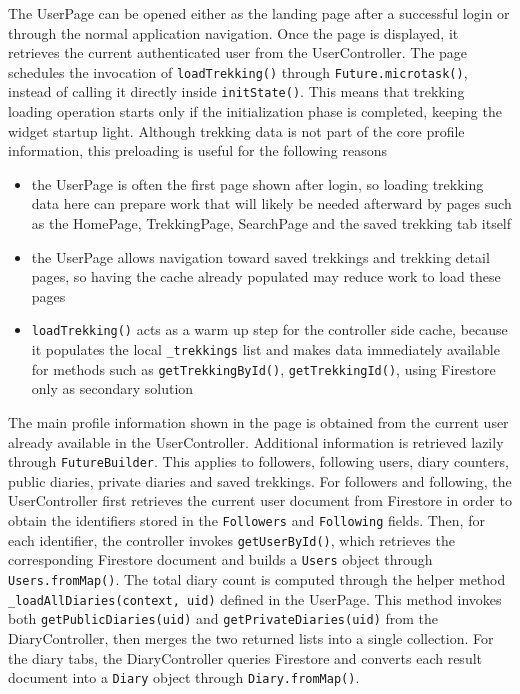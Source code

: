 The UserPage can be opened either as the landing page after a successful login or through the normal application navigation. Once the page is displayed, it retrieves the current authenticated user from the UserController.
The page schedules the invocation of \texttt{loadTrekking()} through \texttt{Future.microtask()}, instead of calling it directly inside \texttt{initState()}. This means that trekking loading operation starts only if the initialization phase is completed, keeping the widget startup light.
Although trekking data is not part of the core profile information, this preloading is useful for the following reasons
\begin{itemize}
    \item the UserPage is often the first page shown after login, so loading trekking data here can prepare work that will likely be needed  afterward by pages such as the HomePage, TrekkingPage, SearchPage and the saved trekking tab itself
    \item the UserPage allows navigation toward saved trekkings and trekking detail pages, so having the cache already populated may reduce work to load these pages
    \item \texttt{loadTrekking()} acts as a warm up step for the controller side cache, because it populates the local \texttt{\_trekkings} list and makes data immediately available for methods such as \texttt{getTrekkingById()}, \texttt{getTrekkingId()}, using Firestore only as secondary solution
\end{itemize}
The main profile information shown in the page is obtained from the current user already available in the UserController. Additional information is retrieved lazily through \texttt{FutureBuilder}. This applies to followers, following users, diary counters, public diaries, private diaries and saved trekkings.
For followers and following, the UserController first retrieves the current user document from Firestore in order to obtain the identifiers stored in the \texttt{Followers} and \texttt{Following} fields. Then, for each identifier, the controller invokes \texttt{getUserById()}, which retrieves the corresponding Firestore document and builds a \texttt{Users} object through \texttt{Users.fromMap()}.
The total diary count is computed through the helper method \texttt{\_loadAllDiaries(context, uid)} defined in the UserPage. This method invokes both \texttt{getPublicDiaries(uid)} and \texttt{getPrivateDiaries(uid)} from the DiaryController, then merges the two returned lists into a single collection. 
For the diary tabs, the DiaryController queries Firestore and converts each result document into a \texttt{Diary} object through \texttt{Diary.fromMap()}.
